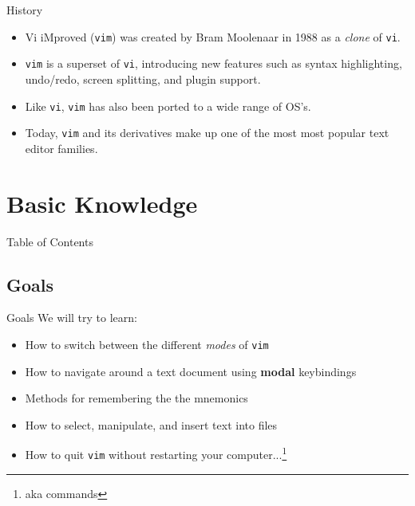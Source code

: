 \documentclass{beamer}
\begin{document}
\begin{frame}{History}
	\begin{itemize}
		\item Vi iMproved (\texttt{vim}) was created by Bram Moolenaar
			in 1988 as a \textit{clone} of \texttt{vi}.
			\pause

		\item \texttt{vim} is a superset of \texttt{vi}, introducing new
			features such as syntax highlighting, undo/redo, screen
			splitting, and plugin support.
			\pause

		\item Like \texttt{vi}, \texttt{vim} has also been ported to a
			wide range of OS's.
			\pause

		\item Today, \texttt{vim} and its derivatives make up one of the
			most most popular text editor families.\footnotemark
	\end{itemize}

\end{frame}


\section{Basic Knowledge}
\begin{frame}{Table of Contents}
	\tableofcontents[currentsection]
\end{frame}

\subsection{Goals}
\begin{frame}{Goals}
	We will try to learn:\\
	\begin{itemize}
		\item How to switch between the different \textit{modes}
			of \texttt{vim}
			\pause

		\item How to navigate around a text document using
			\textbf{modal} keybindings
			\pause

		\item Methods for remembering the the mnemonics
			\pause

		\item How to select, manipulate, and insert text into files
			\pause

		\item How to quit \texttt{vim} without restarting your
			computer...\footnote{aka commands}

	\end{itemize}
\end{frame}
\end{document}
